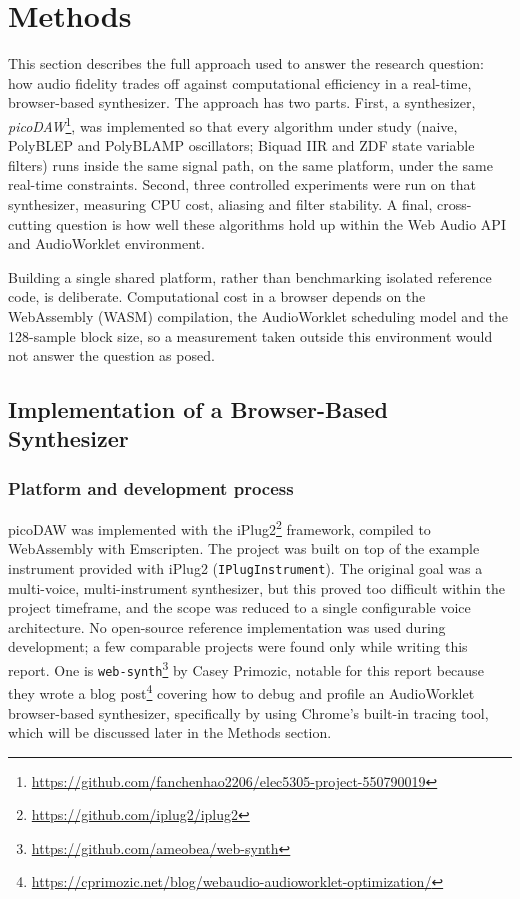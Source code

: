 \section{Methods}
\noindent
This section describes the full approach used to answer the research question: how audio fidelity trades off against computational efficiency in a real-time, browser-based synthesizer. The approach has two parts. First, a synthesizer, \emph{picoDAW}\footnote{\url{https://github.com/fanchenhao2206/elec5305-project-550790019}}, was implemented so that every algorithm under study (naive, PolyBLEP and PolyBLAMP oscillators; Biquad IIR and ZDF state variable filters) runs inside the same signal path, on the same platform, under the same real-time constraints. Second, three controlled experiments were run on that synthesizer, measuring CPU cost, aliasing and filter stability. A final, cross-cutting question is how well these algorithms hold up within the Web Audio API and AudioWorklet environment.

Building a single shared platform, rather than benchmarking isolated reference code, is deliberate. Computational cost in a browser depends on the WebAssembly (WASM) compilation, the AudioWorklet scheduling model and the 128-sample block size, so a measurement taken outside this environment would not answer the question as posed.

\subsection{Implementation of a Browser-Based Synthesizer}
\label{sec:impl}

\subsubsection{Platform and development process}
\noindent
picoDAW was implemented with the iPlug2\footnote{\url{https://github.com/iplug2/iplug2}} framework, compiled to WebAssembly with Emscripten. The project was built on top of the example instrument provided with iPlug2 (\texttt{IPlugInstrument}). The original goal was a multi-voice, multi-instrument synthesizer, but this proved too difficult within the project timeframe, and the scope was reduced to a single configurable voice architecture. No open-source reference implementation was used during development; a few comparable projects were found only while writing this report. One is \texttt{web-synth}\footnote{\url{https://github.com/ameobea/web-synth}} by Casey Primozic, notable for this report because they wrote a blog post\footnote{\url{https://cprimozic.net/blog/webaudio-audioworklet-optimization/}} covering how to debug and profile an AudioWorklet browser-based synthesizer, specifically by using Chrome's built-in tracing tool, which will be discussed later in the Methods section.


